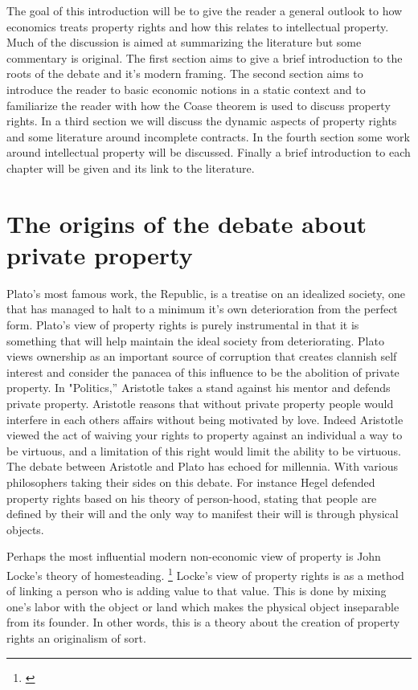 \documentclass[12pt]{article}
\numberwithin{equation}{section}
\begin{document}
The goal of this introduction will be to give the reader a general outlook to how economics treats property rights and how this relates to intellectual property. Much of the discussion is aimed at summarizing the literature but some commentary is original. The first section aims to give a brief introduction to the roots of the debate and it's modern framing. The second section aims to introduce the reader to basic economic notions in a static context and to familiarize the reader with how the Coase theorem is used to discuss property rights. In a third section we will discuss the dynamic aspects of property rights and some literature around incomplete contracts. In the fourth section some work around intellectual property will be discussed. Finally a brief introduction to each chapter will be given and its link to the literature.



\section{The origins of the debate about private property}

Plato's most famous work, the Republic, is a treatise on an idealized society, one that has managed to halt to a minimum it's own deterioration from the perfect form. Plato's view of property rights is purely instrumental in that it is something that will help maintain the ideal society from deteriorating. Plato views ownership as an important source of corruption that creates clannish self interest and consider the panacea of this influence to be the abolition of private property.
In "Politics,'' Aristotle takes a stand against his mentor and defends private property. Aristotle reasons that without private property people would interfere in each others affairs without being motivated by love. Indeed Aristotle viewed the act of waiving your rights to property against an individual a way to be virtuous, and a limitation of this right would limit the ability to be virtuous. The debate between Aristotle and Plato has echoed for millennia. With various philosophers taking their sides on this debate. For instance Hegel defended property rights based on his theory of person-hood, stating that people are defined by their will and the only way to manifest their will is through physical objects.


Perhaps the most influential modern non-economic view of property is John Locke's theory of homesteading. \footnote{\cite{locke2014second}} Locke's view of property rights is as a method of linking a person who is adding value to that value. This is done by mixing one's labor with the object or land which makes the physical object inseparable from its founder. In other words, this is a theory about the creation of property rights an originalism of sort.
\end{document}

